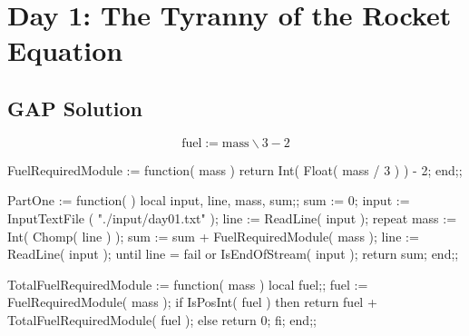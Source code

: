 \newpage%
\section{Day 1: The Tyranny of the Rocket Equation}
\nwenddocs{}\subsection{GAP Solution}

\begin{marginfigure}
\[
 \text{fuel} := \text{mass} \backslash 3 - 2
\]
\end{marginfigure}
\nwenddocs{}\endmoddef\nwstartdeflinemarkup{}\nwenddeflinemarkup
FuelRequiredModule := function( mass )
    return Int( Float( mass / 3 ) ) - 2;
end;;


\nwendcode{}\nwdocspar

\nwenddocs{}\plusendmoddef\nwstartdeflinemarkup{}\nwenddeflinemarkup
PartOne := function( )
    local input, line, mass, sum;;
    sum := 0;
    input := InputTextFile ( "./input/day01.txt" );
    line := ReadLine( input );
    repeat
        mass := Int( Chomp( line ) );
        sum := sum + FuelRequiredModule( mass );
        line := ReadLine( input );
    until line = fail or IsEndOfStream( input );
    return sum;
end;;


\nwendcode{}\nwdocspar

\nwenddocs{}\plusendmoddef\nwstartdeflinemarkup{}\nwenddeflinemarkup
TotalFuelRequiredModule := function( mass )
    local fuel;;
    fuel := FuelRequiredModule( mass );
    if IsPosInt( fuel ) then
        return fuel + TotalFuelRequiredModule( fuel );
    else
        return 0;
    fi;
end;;


